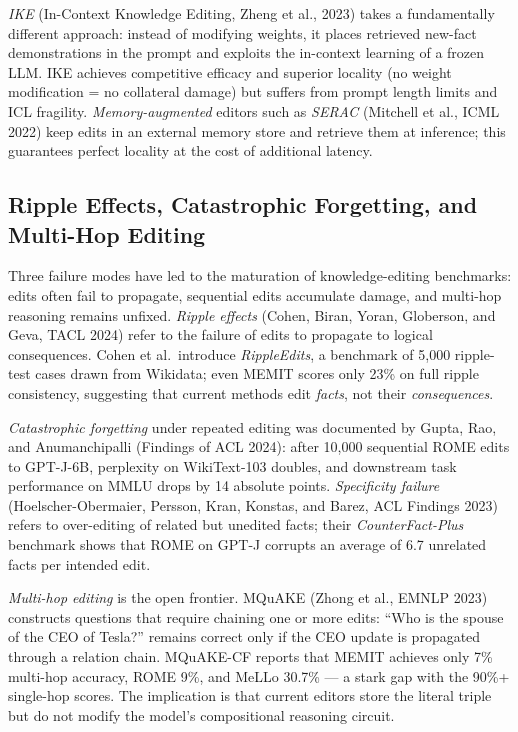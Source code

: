 \emph{IKE} (In-Context Knowledge Editing, Zheng et al., 2023) takes a fundamentally different approach: instead of modifying weights, it places retrieved new-fact demonstrations in the prompt and exploits the in-context learning of a frozen LLM. IKE achieves competitive efficacy and superior locality (no weight modification = no collateral damage) but suffers from prompt length limits and ICL fragility. \emph{Memory-augmented} editors such as \emph{SERAC} (Mitchell et al., ICML 2022) keep edits in an external memory store and retrieve them at inference; this guarantees perfect locality at the cost of additional latency.

\subsection{Ripple Effects, Catastrophic Forgetting, and Multi-Hop Editing}\label{ripple-effects-catastrophic-forgetting-and-multi-hop-editing}

Three failure modes have led to the maturation of knowledge-editing benchmarks: edits often fail to propagate, sequential edits accumulate damage, and multi-hop reasoning remains unfixed. \emph{Ripple effects} (Cohen, Biran, Yoran, Globerson, and Geva, TACL 2024) refer to the failure of edits to propagate to logical consequences. Cohen et al.~introduce \emph{RippleEdits}, a benchmark of 5,000 ripple-test cases drawn from Wikidata; even MEMIT scores only 23\% on full ripple consistency, suggesting that current methods edit \emph{facts}, not their \emph{consequences}.

\emph{Catastrophic forgetting} under repeated editing was documented by Gupta, Rao, and Anumanchipalli (Findings of ACL 2024): after 10,000 sequential ROME edits to GPT-J-6B, perplexity on WikiText-103 doubles, and downstream task performance on MMLU drops by 14 absolute points. \emph{Specificity failure} (Hoelscher-Obermaier, Persson, Kran, Konstas, and Barez, ACL Findings 2023) refers to over-editing of related but unedited facts; their \emph{CounterFact-Plus} benchmark shows that ROME on GPT-J corrupts an average of 6.7 unrelated facts per intended edit.

\emph{Multi-hop editing} is the open frontier. MQuAKE (Zhong et al., EMNLP 2023) constructs questions that require chaining one or more edits: ``Who is the spouse of the CEO of Tesla?'' remains correct only if the CEO update is propagated through a relation chain. MQuAKE-CF reports that MEMIT achieves only 7\% multi-hop accuracy, ROME 9\%, and MeLLo 30.7\% --- a stark gap with the 90\%+ single-hop scores. The implication is that current editors store the literal triple but do not modify the model's compositional reasoning circuit.

